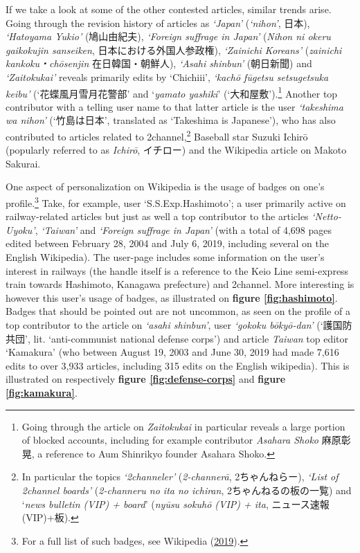\documentclass[10pt,british,A4paper,oneside]{memoir}
\begin{document}
If we take a look at some of the other contested articles, similar
trends arise. Going through the revision history of articles as
\emph{`Japan'} (\emph{`nihon'}, 日本), \emph{`Hatoyama Yukio'}
(鳩山由紀夫), \emph{`Foreign suffrage in Japan'} (\emph{Nihon ni okeru
gaikokujin sanseiken}, 日本における外国人参政権), \emph{`Zainichi
Koreans'} (\emph{zainichi kankoku・chōsenjin} 在日韓国・朝鮮人),
\emph{`Asahi shinbun'} (朝日新聞) and \emph{`Zaitokukai'} reveals
primarily edits by `Chichiii', \emph{`kachō fūgetsu setsugetsuka keibu'}
(`花蝶風月雪月花警部' and `\emph{yamato yashiki}'
(`大和屋敷').\footnote{Going through the article on \emph{Zaitokukai} in
  particular reveals a large portion of blocked accounts, including for
  example contributor \emph{Asahara Shoko} 麻原彰晃, a reference to Aum
  Shinrikyo founder Asahara Shoko.} Another top contributor with a
telling user name to that latter article is the user \emph{`takeshima wa
nihon'} (`竹島は日本', translated as `Takeshima is Japanese'), who has
also contributed to articles related to 2channel,\footnote{In particular
  the topics \emph{`2channeler'} (\emph{2-channerā}, 2ちゃんねらー),
  \emph{`List of 2channel boards'} (\emph{2-channeru no ita no ichiran},
  2ちゃんねるの板の一覧) and `\emph{news bulletin (VIP) + board}'
  (\emph{nyūsu sokuhō (VIP) + ita}, ニュース速報(VIP)+板).} Baseball
star Suzuki Ichirō (popularly referred to as \emph{Ichirō}, イチロー)
and the Wikipedia article on Makoto Sakurai.

One aspect of personalization on Wikipedia is the usage of badges on
one's profile.\footnote{For a full list of such badges, see Wikipedia
  (\protect\hyperlink{ref-anonymous_wikipedia:_2019}{2019}).}
Take, for example, user `S.S.Exp.Hashimoto'; a user primarily active on
railway-related articles but just as well a top contributor to the
articles \emph{`Netto-Uyoku'}, \emph{`Taiwan'} and \emph{`Foreign
suffrage in Japan'} (with a total of 4,698 pages edited between February
28, 2004 and July 6, 2019, including several on the English Wikipedia).
The user-page includes some information on the user's interest in
railways (the handle itself is a reference to the Keio Line semi-express
train towards Hashimoto, Kanagawa prefecture) and 2channel. More
interesting is however this user's usage of badges, as illustrated on
\textbf{figure \ref{fig:hashimoto}}. Badges that should be pointed out
are not uncommon, as seen on the profile of a top contributor to the
article on \emph{`asahi shinbun'}, user \emph{`gokoku bōkyō-dan'}
(`護国防共団', lit. `anti-communist national defense corps') and article
\emph{Taiwan} top editor `Kamakura' (who between August 19, 2003 and
June 30, 2019 had made 7,616 edits to over 3,933 articles, including 315
edits on the English wikipedia). This is illustrated on respectively
\textbf{figure \ref{fig:defense-corps}} and \textbf{figure
\ref{fig:kamakura}}.
\end{document}
